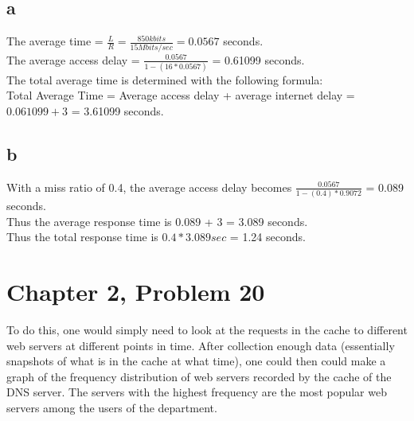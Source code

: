 \documentclass{article}
\begin{document}
\subsection{a}
The average time = $\frac{L}{R} = \frac{850k bits}{15M bits/sec} = 0.0567$ seconds.\\
\newline The average access delay = $\frac{0.0567}{1- (16 * 0.0567)}$ = 0.61099 seconds.\\
\newline The total average time is determined with the following formula:\\
\newline Total Average Time = Average access delay + average internet delay = $0.061099 + 3$ = 3.61099 seconds.\\

\subsection{b}
With a miss ratio of 0.4, the average access delay becomes $\frac{0.0567}{1- (0.4) * 0.9072}$ = 0.089 seconds.\\
\newline Thus the average response time is 0.089 + 3 = 3.089 seconds.\\
\newline Thus the total response time is $0.4 * 3.089 sec$ = 1.24 seconds.\\

\section{Chapter 2, Problem 20}
To do this, one would simply need to look at the requests in the cache to different web servers at different points in time.  After collection enough data (essentially snapshots of what is in the cache at what time), one could then could make a graph of the frequency distribution of web servers recorded by the cache of the DNS server.  The servers with the highest frequency are the most popular web servers among the users of the department.\\
\end{document}

